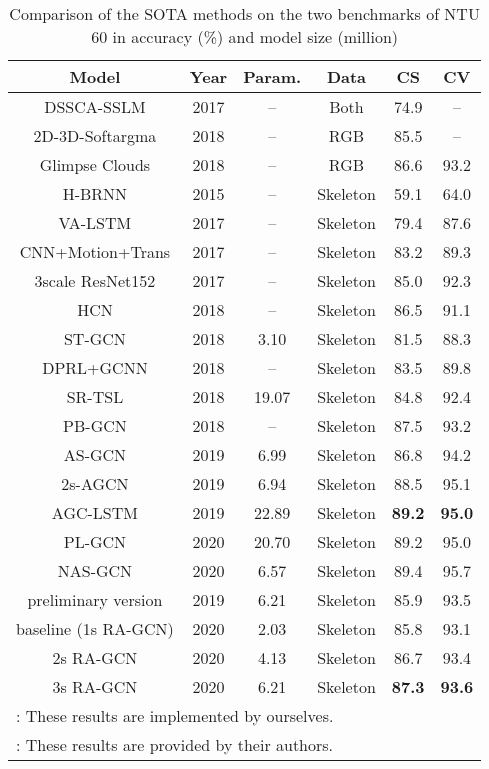 \documentclass[journal]{IEEEtran}
\begin{document}
\begin{table}[t]
\caption{Comparison of the SOTA methods on the two benchmarks of NTU 60 in accuracy (\%) and model size (million)}
\label{tab:ntu60}
\centering
\begin{tabular}{cc|cc|cc}
\hline
Model & Year & Param. & Data & CS & CV \\
\hline
DSSCA-SSLM \cite{shahroudy2017deep} & 2017 & -- & Both & 74.9 & -- \\
2D-3D-Softargma \cite{luvizon20182d} & 2018 & -- & RGB & 85.5 & -- \\
Glimpse Clouds \cite{baradel2018glimpse} & 2018 & -- & RGB & 86.6 & 93.2 \\
\hline
\hline
H-BRNN \cite{du2015hierarchical} & 2015 & -- & Skeleton & 59.1 & 64.0 \\
VA-LSTM \cite{zhang2017view} & 2017 & -- & Skeleton & 79.4 & 87.6 \\
CNN+Motion+Trans \cite{li2017skeleton} & 2017 & -- & Skeleton & 83.2 & 89.3 \\
3scale ResNet152 \cite{li2017skeleton2} & 2017 & -- & Skeleton & 85.0 & 92.3 \\
HCN \cite{li2018co} & 2018 & -- & Skeleton & 86.5 & 91.1 \\
\hline
ST-GCN \cite{yan2018spatial} & 2018 & 3.10 & Skeleton & 81.5 & 88.3 \\
DPRL+GCNN \cite{tang2018deep} & 2018 & -- & Skeleton & 83.5 & 89.8 \\
SR-TSL \cite{si2018skeleton} & 2018 & 19.07 & Skeleton & 84.8 & 92.4 \\
PB-GCN \cite{thakkar2018part} & 2018 & -- & Skeleton & 87.5 & 93.2 \\
AS-GCN \cite{li2019actional} & 2019 & 6.99 & Skeleton & 86.8 & 94.2 \\
2s-AGCN \cite{shi2019two} & 2019 & 6.94 & Skeleton & 88.5 & 95.1 \\
AGC-LSTM \cite{si2019attention} & 2019 & 22.89 & Skeleton & {\bf 89.2} & {\bf 95.0} \\
PL-GCN \cite{huang2020part} & 2020 & 20.70 & Skeleton & 89.2 & 95.0 \\
NAS-GCN \cite{peng2020learning} & 2020 & 6.57 & Skeleton & 89.4 & 95.7 \\
\hline
preliminary version \cite{song2019richly} & 2019 & 6.21 & Skeleton & 85.9 & 93.5 \\
baseline (1s RA-GCN) & 2020 & 2.03 & Skeleton & 85.8 & 93.1 \\
2s RA-GCN & 2020 & 4.13 & Skeleton & 86.7 & 93.4 \\
3s RA-GCN & 2020 & 6.21 & Skeleton & {\bf 87.3} & {\bf 93.6} \\
\hline
\multicolumn{6}{l}{: These results are implemented by ourselves.} \\
\multicolumn{6}{l}{: These results are provided by their authors.} \\
\end{tabular}
\vspace{-0.4cm}
\end{table}
\end{document}

